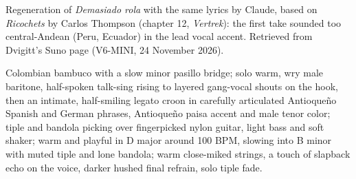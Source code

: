 
\begin{notes}
Regeneration of \emph{Demasiado rola} with the same lyrics by Claude, based on \emph{Ricochets} by Carlos Thompson (chapter 12, \emph{Vertrek}): the first take sounded too central-Andean (Peru, Ecuador) in the lead vocal accent. Retrieved from Dvigitt's Suno page (V6-MINI, 24 November 2026).
\end{notes}
\begin{style}
Colombian bambuco with a slow minor pasillo bridge; solo warm, wry male baritone, half-spoken talk-sing rising to layered gang-vocal shouts on the hook, then an intimate, half-smiling legato croon in carefully articulated Antioqueño Spanish and German phrases, Antioqueño paisa accent and male tenor color; tiple and bandola picking over fingerpicked nylon guitar, light bass and soft shaker; warm and playful in D major around 100 BPM, slowing into B minor with muted tiple and lone bandola; warm close-miked strings, a touch of slapback echo on the voice, darker hushed final refrain, solo tiple fade.
\end{style}

